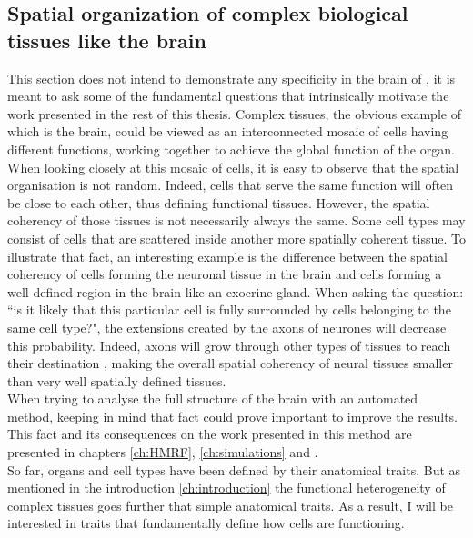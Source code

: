           \subsection{Spatial organization of complex biological tissues like the brain}
     This section does not intend to demonstrate any specificity in the brain of \platy{}, it is meant to ask some of the fundamental questions that intrinsically motivate the work presented in the rest of this thesis. Complex tissues, the obvious example of which is the brain, could be viewed as an interconnected mosaic of cells having different functions, working together to achieve the global function of the organ.\\
     
     When looking closely at this mosaic of cells, it is easy to observe that the spatial organisation is not random. Indeed, cells that serve the same function will often be close to each other, thus defining functional tissues. However, the spatial coherency of those tissues is not necessarily always the same. Some cell types may consist of cells that are scattered inside another more spatially coherent tissue. To illustrate that fact, an interesting example is the difference between the spatial coherency of cells forming the neuronal tissue in the brain and cells forming a well defined region in the brain like an exocrine gland. When asking the question: ``is it likely that this particular cell is fully surrounded by cells belonging to the same cell type?", the extensions created by the axons of neurones will decrease this probability. Indeed, axons will grow through other types of tissues to reach their destination \cite{bartlett84,colello90}, making the overall spatial coherency of neural tissues smaller than very well spatially defined tissues.\\
     
     When trying to analyse the full structure of the brain with an automated method, keeping in mind that fact could prove important to improve the results. This fact and its consequences on the work presented in this method are presented in chapters \ref{ch:HMRF}, \ref{ch:simulations} and .\\
     
     So far, organs and cell types have been defined by their anatomical traits. But as mentioned in the introduction \ref{ch:introduction} the functional heterogeneity of complex tissues goes further that simple anatomical traits. As a result, I will be interested in traits that fundamentally define how cells are functioning.
     
